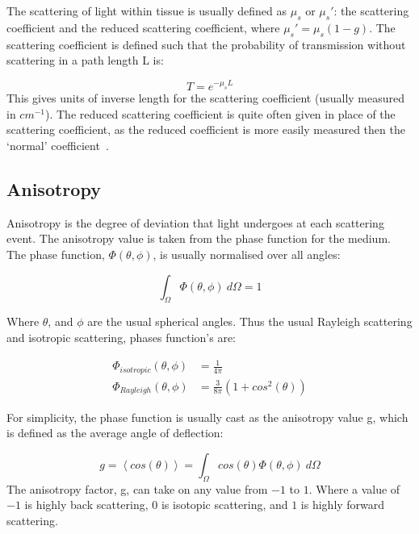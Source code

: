 \medskip

The scattering of light within tissue is usually defined as $\mu_s$ or $\mu_s'$: the scattering coefficient and the reduced scattering coefficient, where $\mu_s'=\mu_s(1-g)$. The scattering coefficient is defined such that the probability of transmission without scattering in a path length L is:

\begin{equation}
	T=e^{-\mu_sL}
\end{equation}
This gives units of inverse length for the scattering coefficient (usually measured in $cm^{-1}$). The reduced scattering coefficient is quite often given in place of the scattering coefficient, as the reduced coefficient is more easily measured then the `normal' coefficient~\cite{jacques2013optical}.



\subsection{Anisotropy}\label{sec:ansio}

Anisotropy is the degree of deviation that light undergoes at each scattering event. The anisotropy value is taken from the phase function for the medium. The phase function, $\Phi(\theta,\phi)$, is usually normalised over all angles:

\begin{equation}
	\int_{\Omega}\Phi(\theta,\phi)\ d\Omega = 1
\end{equation}

Where $\theta$, and $\phi$ are the usual spherical angles.
Thus the usual Rayleigh scattering and isotropic scattering, phases function's are:

\begin{align}
	\Phi_{isotropic}(\theta,\phi)&=\frac{1}{4\pi}\\
	\Phi_{Rayleigh}(\theta,\phi)&=\frac{3}{8\pi}(1+cos^2(\theta))
\end{align}

For simplicity, the phase function is usually cast as the anisotropy value g, which is defined as the average angle of deflection:

\begin{equation}
	g=\left<cos(\theta)\right>=\int_{\Omega}cos(\theta)\Phi(\theta,\phi)\ d\Omega
\end{equation}
The anisotropy factor, g, can take on any value from $-1$ to $1$. Where a value of $-1$ is highly back scattering, $0$ is isotopic scattering, and $1$ is highly forward scattering.


